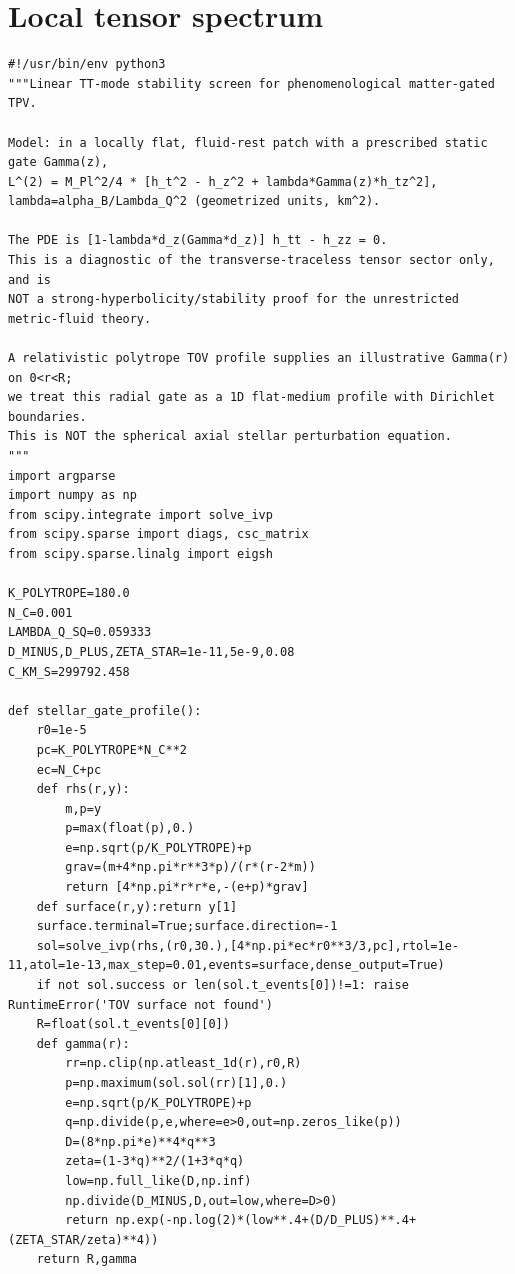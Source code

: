 \documentclass[11pt,oneside]{report}
\begin{document}
\section{Local tensor spectrum}
\noindent{}\par
\begin{Verbatim}[breaklines=true,breakanywhere=true,fontsize=\scriptsize]
#!/usr/bin/env python3
"""Linear TT-mode stability screen for phenomenological matter-gated TPV.

Model: in a locally flat, fluid-rest patch with a prescribed static gate Gamma(z),
L^(2) = M_Pl^2/4 * [h_t^2 - h_z^2 + lambda*Gamma(z)*h_tz^2],
lambda=alpha_B/Lambda_Q^2 (geometrized units, km^2).

The PDE is [1-lambda*d_z(Gamma*d_z)] h_tt - h_zz = 0.
This is a diagnostic of the transverse-traceless tensor sector only, and is
NOT a strong-hyperbolicity/stability proof for the unrestricted metric-fluid theory.

A relativistic polytrope TOV profile supplies an illustrative Gamma(r) on 0<r<R;
we treat this radial gate as a 1D flat-medium profile with Dirichlet boundaries.
This is NOT the spherical axial stellar perturbation equation.
"""
import argparse
import numpy as np
from scipy.integrate import solve_ivp
from scipy.sparse import diags, csc_matrix
from scipy.sparse.linalg import eigsh

K_POLYTROPE=180.0
N_C=0.001
LAMBDA_Q_SQ=0.059333
D_MINUS,D_PLUS,ZETA_STAR=1e-11,5e-9,0.08
C_KM_S=299792.458

def stellar_gate_profile():
    r0=1e-5
    pc=K_POLYTROPE*N_C**2
    ec=N_C+pc
    def rhs(r,y):
        m,p=y
        p=max(float(p),0.)
        e=np.sqrt(p/K_POLYTROPE)+p
        grav=(m+4*np.pi*r**3*p)/(r*(r-2*m))
        return [4*np.pi*r*r*e,-(e+p)*grav]
    def surface(r,y):return y[1]
    surface.terminal=True;surface.direction=-1
    sol=solve_ivp(rhs,(r0,30.),[4*np.pi*ec*r0**3/3,pc],rtol=1e-11,atol=1e-13,max_step=0.01,events=surface,dense_output=True)
    if not sol.success or len(sol.t_events[0])!=1: raise RuntimeError('TOV surface not found')
    R=float(sol.t_events[0][0])
    def gamma(r):
        rr=np.clip(np.atleast_1d(r),r0,R)
        p=np.maximum(sol.sol(rr)[1],0.)
        e=np.sqrt(p/K_POLYTROPE)+p
        q=np.divide(p,e,where=e>0,out=np.zeros_like(p))
        D=(8*np.pi*e)**4*q**3
        zeta=(1-3*q)**2/(1+3*q*q)
        low=np.full_like(D,np.inf)
        np.divide(D_MINUS,D,out=low,where=D>0)
        return np.exp(-np.log(2)*(low**.4+(D/D_PLUS)**.4+(ZETA_STAR/zeta)**4))
    return R,gamma


\end{Verbatim}
\end{document}
